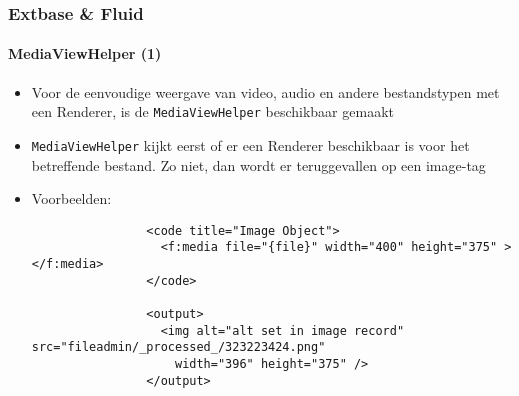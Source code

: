 
\begin{frame}[fragile]
	\frametitle{Extbase \& Fluid}
	\framesubtitle{MediaViewHelper (1)}

	\lstset{basicstyle=\tiny\ttfamily}

	\begin{itemize}

		\item Voor de eenvoudige weergave van video, audio en andere bestandstypen met een Renderer, 
			is de \texttt{MediaViewHelper} beschikbaar gemaakt

		\item \texttt{MediaViewHelper} kijkt eerst of er een Renderer beschikbaar is voor het betreffende 
			bestand. Zo niet, dan wordt er teruggevallen op een image-tag

		\item Voorbeelden:

			\begin{lstlisting}
				<code title="Image Object">
				  <f:media file="{file}" width="400" height="375" ></f:media>
				</code>

				<output>
				  <img alt="alt set in image record" src="fileadmin/_processed_/323223424.png"
				    width="396" height="375" />
				</output>
			\end{lstlisting}

	\end{itemize}

\end{frame}


